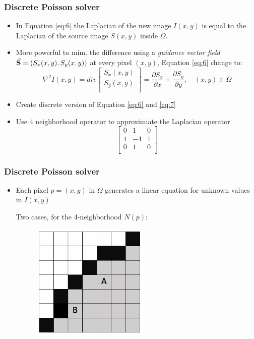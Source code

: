 \documentclass{beamer}
\begin{document}
\begin{frame}
    \frametitle{Discrete Poisson solver}
    \begin{itemize}
        \item In Equation \ref{eq:6} the Laplacian of the new image $I(x,y)$ is equal to the Laplacian of the source image $S(x,y)$ inside $\Omega$. 
        \item More powerful to mim. the difference using a {\it guidance vector field} $\vec{{\bf S}}=(S_x(x,y), S_y(x,y))$ at every pixel $(x,y)$, Equation \ref{eq:6} change to:        
        \begin{equation}
            \label{eq:8}
            \nabla^2 I(x,y) = div
            \begin{bmatrix}
                S_x(x,y) \\[0.3em]
                S_y(x,y) \\[0.3em]                
            \end{bmatrix}
            = \frac{\partial S_x}{\partial x}+\frac{\partial S_y}{\partial y}, \quad (x,y) \in \Omega
        \end{equation} 
        \item Create discrete version of Equation \ref{eq:6} and \ref{eq:7} 
        \item Use 4 neighborhood operator to approximiate the Laplacian operator 
        \[
        \begin{bmatrix}
            0 & 1 & 0       \\[0.3em]
            1 & -4 & 1      \\[0.3em]
            0 & 1 & 0       \\[0.3em]
          \end{bmatrix}
        \]
    \end{itemize}        
\end{frame} 

\begin{frame}
    \frametitle{Discrete Poisson solver}
    \begin{itemize}    
        \item Each pixel $p=(x,y)$ in $\Omega$ generates a linear equation for unknown values in $I(x,y)$    
        \begin{item} 
            Two cases, for the 4-neighborhood $N(p)$: 
            \begin{figure}[!ht]
                \centering
                \includegraphics[width=2.2in]{resource/grid.png}            
            \end{figure}            
        \end{item}
    \end{itemize}
\end{frame} 
\end{document}
